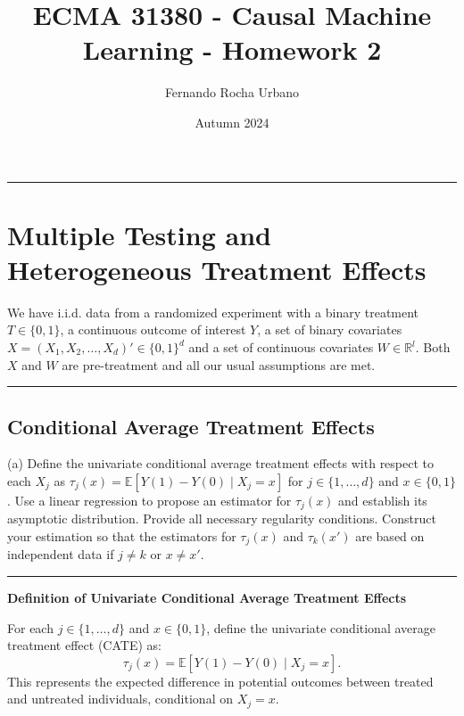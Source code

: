 \documentclass{article}
\title{ECMA 31380 - Causal Machine Learning - Homework 2}
\author{Fernando Rocha Urbano}
\date{Autumn 2024}
\newenvironment{colorparagraph}[1]{\par\color{#1}}{\par}
\begin{document}
\maketitle

\begin{colorparagraph}{questioncolor}
\rule{\textwidth}{0.5pt}

\label{q1}\section{Multiple Testing and Heterogeneous Treatment Effects}

We have i.i.d. data from a randomized experiment with a binary treatment \( T \in \{0,1\} \), a continuous outcome of interest \( Y \), a set of binary covariates \( X = (X_1, X_2, \dots, X_d)' \in \{0,1\}^d \) and a set of continuous covariates \( W \in \mathbb{R}^l \). Both \( X \) and \( W \) are pre-treatment and all our usual assumptions are met.

\rule{\textwidth}{0.5pt}
\end{colorparagraph}

\begin{colorparagraph}{questioncolor}
\label{q1a}\subsection{Conditional Average Treatment Effects}
(a) Define the univariate conditional average treatment effects with respect to each \( X_j \) as \( \tau_j(x) = \mathbb{E}[Y(1) - Y(0) \mid X_j = x] \) for \( j \in \{1, \dots, d\} \) and \( x \in \{0, 1\} \). Use a linear regression to propose an estimator for \( \tau_j(x) \) and establish its asymptotic distribution. Provide all necessary regularity conditions. Construct your estimation so that the estimators for \( \tau_j(x) \) and \( \tau_k(x') \) are based on independent data if \( j \neq k \) or \( x \neq x' \).

\rule{\textwidth}{0.5pt}
\end{colorparagraph}

\textbf{Definition of Univariate Conditional Average Treatment Effects}

For each \( j \in \{1, \dots, d\} \) and \( x \in \{0,1\} \), define the univariate conditional average treatment effect (CATE) as:
\[
\tau_j(x) = \mathbb{E}[Y(1) - Y(0) \mid X_j = x].
\]
This represents the expected difference in potential outcomes between treated and untreated individuals, conditional on \( X_j = x \).
\end{document}
